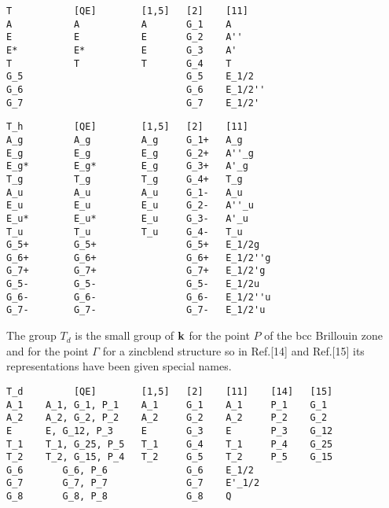 \documentclass[12pt,a4paper,twoside]{report}
\begin{document}
\begin{tcolorbox}
\begin{footnotesize}
\begin{verbatim}
T           [QE]        [1,5]   [2]    [11]
A           A           A       G_1    A
E           E           E       G_2    A''
E*          E*          E       G_3    A'
T           T           T       G_4    T
G_5                             G_5    E_1/2
G_6                             G_6    E_1/2''
G_7                             G_7    E_1/2'
\end{verbatim}
\end{footnotesize}
\end{tcolorbox}

\begin{tcolorbox}
\begin{footnotesize}
\begin{verbatim}
T_h         [QE]        [1,5]   [2]    [11]
A_g         A_g         A_g     G_1+   A_g
E_g         E_g         E_g     G_2+   A''_g
E_g*        E_g*        E_g     G_3+   A'_g
T_g         T_g         T_g     G_4+   T_g
A_u         A_u         A_u     G_1-   A_u
E_u         E_u         E_u     G_2-   A''_u
E_u*        E_u*        E_u     G_3-   A'_u
T_u         T_u         T_u     G_4-   T_u
G_5+        G_5+                G_5+   E_1/2g
G_6+        G_6+                G_6+   E_1/2''g 
G_7+        G_7+                G_7+   E_1/2'g
G_5-        G_5-                G_5-   E_1/2u
G_6-        G_6-                G_6-   E_1/2''u
G_7-        G_7-                G_7-   E_1/2'u
\end{verbatim}
\end{footnotesize}
\end{tcolorbox}


The group $T_d$ is the small group of ${\bf k}$ for the point $P$ of the
bcc Brillouin zone and for the point $\Gamma$ for a zincblend structure
so in Ref.[14] and Ref.[15] its representations have been given 
special names. 

\begin{tcolorbox}
\begin{footnotesize}
\begin{verbatim}
T_d         [QE]        [1,5]   [2]    [11]    [14]   [15]
A_1    A_1, G_1, P_1    A_1     G_1    A_1     P_1    G_1
A_2    A_2, G_2, P_2    A_2     G_2    A_2     P_2    G_2
E      E, G_12, P_3     E       G_3    E       P_3    G_12
T_1    T_1, G_25, P_5   T_1     G_4    T_1     P_4    G_25
T_2    T_2, G_15, P_4   T_2     G_5    T_2     P_5    G_15
G_6       G_6, P_6              G_6    E_1/2
G_7       G_7, P_7              G_7    E'_1/2
G_8       G_8, P_8              G_8    Q
\end{verbatim}
\end{footnotesize}
\end{tcolorbox}
\end{document}
